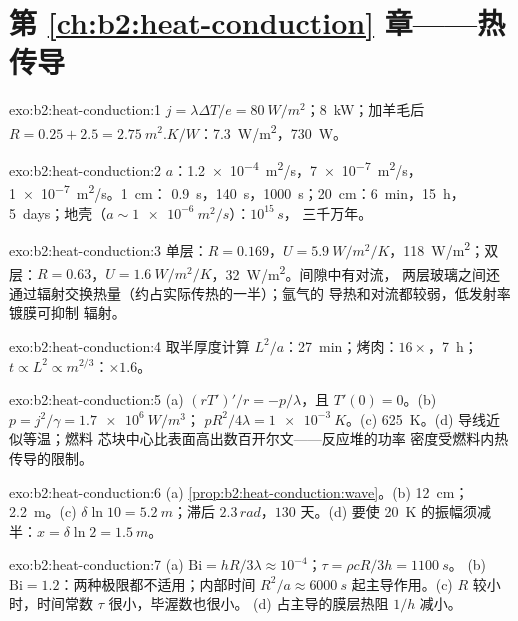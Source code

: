 \section*{第 \ref{ch:b2:heat-conduction} 章——热传导}

\begin{solution}{exo:b2:heat-conduction:1}
$j = \lambda\Delta T/e = \qty{80}{W/m^2}$；\qty{8}{kW}；加羊毛后 $R = 0.25 + 2.5 =
\qty{2.75}{m^2.K/W}$：\qty{7.3}{W/m^2}，\qty{730}{W}。
\end{solution}

\begin{solution}{exo:b2:heat-conduction:2}
$a$：\qty{1.2e-4}{m^2/s}，\qty{7e-7}{m^2/s}，\qty{1e-7}{m^2/s}。\qty{1}{cm}：
\qty{0.9}{s}，\qty{140}{s}，\qty{1000}{s}；\qty{20}{cm}：\qty{6}{min}，\qty{15}{h}，
\qty{5}{days}；地壳（$a \sim \qty{1e-6}{m^2/s}$）：$10^{15}\,\unit{s}$，
三千万年。
\end{solution}

\begin{solution}{exo:b2:heat-conduction:3}
单层：$R = 0.169$，$U = \qty{5.9}{W/m^2/K}$，\qty{118}{W/m^2}；双层：$R =
0.63$，$U = \qty{1.6}{W/m^2/K}$，\qty{32}{W/m^2}。间隙中有对流，
两层玻璃之间还通过辐射交换热量（约占实际传热的一半）；氩气的
导热和对流都较弱，低发射率镀膜可抑制
辐射。
\end{solution}

\begin{solution}{exo:b2:heat-conduction:4}
取半厚度计算 $L^2/a$：\qty{27}{min}；烤肉：$16\times$，\qty{7}{h}；
$t \propto L^2 \propto m^{2/3}$：$\times 1.6$。
\end{solution}

\begin{solution}{exo:b2:heat-conduction:5}
(a) $(rT')'/r = -p/\lambda$，且 $T'(0) = 0$。(b) $p = j^2/\gamma = \qty{1.7e6}{W/m^3}$；
$pR^2/4\lambda = \qty{1e-3}{K}$。(c) \qty{625}{K}。(d) 导线近似等温；燃料
芯块中心比表面高出数百开尔文——反应堆的功率
密度受燃料内热传导的限制。
\end{solution}

\begin{solution}{exo:b2:heat-conduction:6}
(a) \cref{prop:b2:heat-conduction:wave}。(b) \qty{12}{cm}；\qty{2.2}{m}。(c)
$\delta\ln 10 = \qty{5.2}{m}$；滞后 $2.3\,\unit{rad}$，$130$ 天。(d) 要使
\qty{20}{K} 的振幅须减半：$x = \delta\ln 2 = \qty{1.5}{m}$。
\end{solution}

\begin{solution}{exo:b2:heat-conduction:7}
(a) $\mathrm{Bi} = hR/3\lambda \approx 10^{-4}$；$\tau = \rho cR/3h = \qty{1100}{s}$。
(b) $\mathrm{Bi} = 1.2$：两种极限都不适用；内部时间 $R^2/a \approx
\qty{6000}{s}$ 起主导作用。(c) $R$ 较小时，时间常数 $\tau$ 很小，毕渥数也很小。
(d) 占主导的膜层热阻 $1/h$ 减小。
\end{solution}

